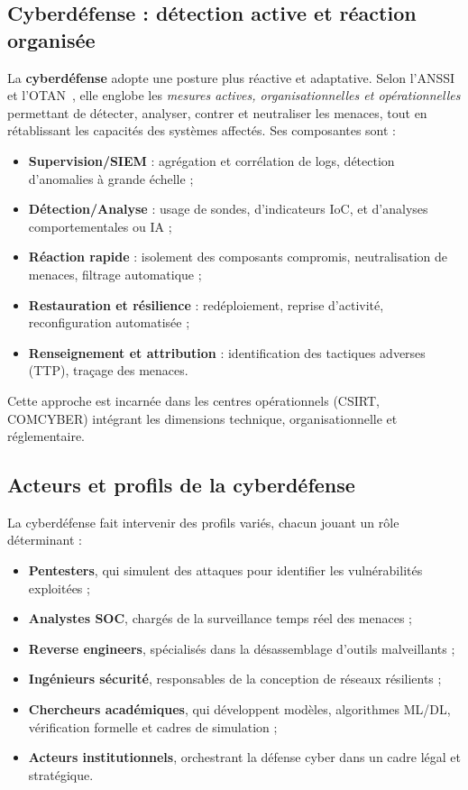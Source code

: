 \documentclass[ twoside,openright,titlepage,numbers=noenddot,headinclude,%
                footinclude=true,cleardoublepage=empty,abstractoff, %
                BCOR=5mm,paper=a4,fontsize=11pt,%
                french,american,%
                ]{scrreprt}
\begin{document}
\subsection*{Cyberdéfense : détection active et réaction organisée}

La \textbf{cyberdéfense} adopte une posture plus réactive et adaptative. Selon l'ANSSI et l'OTAN~\cite{ANSSI2020,NATO2016Cyberdef}, elle englobe les \emph{mesures actives, organisationnelles et opérationnelles} permettant de détecter, analyser, contrer et neutraliser les menaces, tout en rétablissant les capacités des systèmes affectés. Ses composantes sont :
\begin{itemize}
  \item \textbf{Supervision/SIEM} : agrégation et corrélation de logs, détection d'anomalies à grande échelle ;
  \item \textbf{Détection/Analyse} : usage de sondes, d'indicateurs IoC, et d'analyses comportementales ou IA ;
  \item \textbf{Réaction rapide} : isolement des composants compromis, neutralisation de menaces, filtrage automatique ;
  \item \textbf{Restauration et résilience} : redéploiement, reprise d'activité, reconfiguration automatisée ;
  \item \textbf{Renseignement et attribution} : identification des tactiques adverses (TTP), traçage des menaces.
\end{itemize}
Cette approche est incarnée dans les centres opérationnels (CSIRT, COMCYBER) intégrant les dimensions technique, organisationnelle et réglementaire.

\subsection*{Acteurs et profils de la cyberdéfense}

La cyberdéfense fait intervenir des profils variés, chacun jouant un rôle déterminant :
\begin{itemize}
  \item \textbf{Pentesters}, qui simulent des attaques pour identifier les vulnérabilités exploitées ;
  \item \textbf{Analystes SOC}, chargés de la surveillance temps réel des menaces ;
  \item \textbf{Reverse engineers}, spécialisés dans la désassemblage d'outils malveillants ;
  \item \textbf{Ingénieurs sécurité}, responsables de la conception de réseaux résilients ;
  \item \textbf{Chercheurs académiques}, qui développent modèles, algorithmes ML/DL, vérification formelle et cadres de simulation ;
  \item \textbf{Acteurs institutionnels}, orchestrant la défense cyber dans un cadre légal et stratégique.
\end{itemize}
\end{document}
